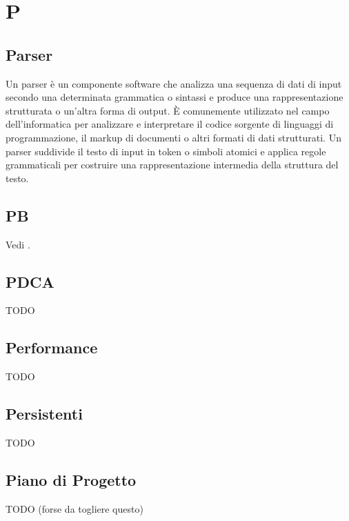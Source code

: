\section{P}

\vspace{2em}
\subsection*{Parser}
Un parser è un componente software che analizza una sequenza di dati di input secondo una determinata grammatica o sintassi e produce una rappresentazione strutturata o un'altra forma di output. È comunemente utilizzato nel campo dell'informatica per analizzare e interpretare il codice sorgente di linguaggi di programmazione, il markup di documenti o altri formati di dati strutturati. Un parser suddivide il testo di input in token o simboli atomici e applica regole grammaticali per costruire una rappresentazione intermedia della struttura del testo.

\vspace{2em}
\subsection*{PB}
\par Vedi .

\vspace{2em}
\subsection*{PDCA}
TODO

\vspace{2em}
\subsection*{Performance}
TODO

\vspace{2em}
\subsection*{Persistenti}
TODO

\vspace{2em}
\subsection*{Piano di Progetto}
TODO (forse da togliere questo)

\vspace{2em}
